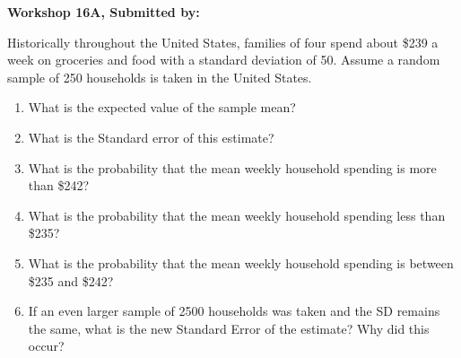 \documentclass[11pt, chapterprefix=true]{scrbook}\usepackage[]{graphicx}\usepackage[]{color}
\begin{document}
\begin{exercises}
\begin{exercise}
\end{exercise}
\begin{solution}  %

\end{solution}

\clearpage

    \begin{exercise}  %

    \begin{center}
\begin{flushleft}\textbf{\large \hfill Workshop 16A, Submitted by: }\end{flushleft}

\end{center}


Historically throughout the United States, families of four spend about \$239 a week on groceries and food with a standard deviation of 50. Assume a random sample of 250 households is taken in the United States.

\begin{enumerate} 
\item What is the expected value of the sample mean?
\item What is the Standard error of this estimate?
\item What is the probability that the mean weekly household spending is more than \$242?
\item What is the probability that the mean weekly household spending less than \$235?
\item What is the probability that the mean weekly household spending is between \$235 and \$242?
\item If an even larger sample of 2500 households was taken and the SD remains the same, what is the new Standard Error of the estimate? Why did this occur?
\end{enumerate}


\end{exercise}
\end{exercises}
\end{document}
